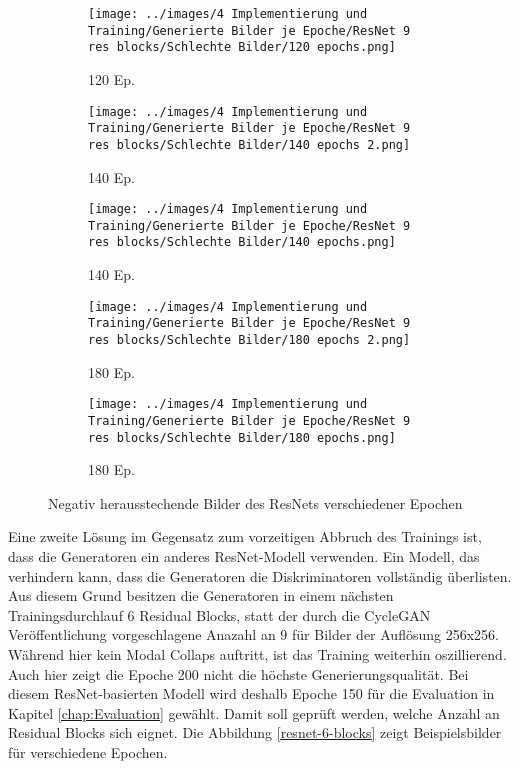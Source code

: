\begin{figure}[h]
    \centering
    \begin{subfigure}[b]{0.12\textwidth}
        \centering
        \texttt{[image: ../images/4 Implementierung und Training/Generierte Bilder je Epoche/ResNet 9 res blocks/Schlechte Bilder/120 epochs.png]}
        \caption{120 Ep.}
    \end{subfigure}
    \hspace{3em}%
    \begin{subfigure}[b]{0.12\textwidth}
        \centering
        \texttt{[image: ../images/4 Implementierung und Training/Generierte Bilder je Epoche/ResNet 9 res blocks/Schlechte Bilder/140 epochs 2.png]}
        \caption{140 Ep.}
    \end{subfigure}
    \hspace{3em}%
    \begin{subfigure}[b]{0.12\textwidth}
        \centering
        \texttt{[image: ../images/4 Implementierung und Training/Generierte Bilder je Epoche/ResNet 9 res blocks/Schlechte Bilder/140 epochs.png]}
        \caption{140 Ep.}
    \end{subfigure}
    \hspace{3em}%
    \begin{subfigure}[b]{0.12\textwidth}
        \centering
        \texttt{[image: ../images/4 Implementierung und Training/Generierte Bilder je Epoche/ResNet 9 res blocks/Schlechte Bilder/180 epochs 2.png]}
        \caption{180 Ep.}
    \end{subfigure}
    \hspace{3em}%
    \begin{subfigure}[b]{0.12\textwidth}
    \centering
    \texttt{[image: ../images/4 Implementierung und Training/Generierte Bilder je Epoche/ResNet 9 res blocks/Schlechte Bilder/180 epochs.png]}
    \caption{180 Ep.}
\end{subfigure}
        \caption{Negativ herausstechende Bilder des ResNets verschiedener Epochen}
        \label{fig:resnet-schlechte-bilder}
\end{figure}

Eine zweite Lösung im Gegensatz zum vorzeitigen Abbruch des Trainings ist, dass die Generatoren ein anderes ResNet-Modell verwenden. Ein Modell, das verhindern kann, dass die Generatoren die Diskriminatoren vollständig überlisten. Aus diesem Grund besitzen die Generatoren in einem nächsten Trainingsdurchlauf 6 Residual Blocks, statt der durch die \ac{CycleGAN} Veröffentlichung vorgeschlagene Anazahl an 9 für Bilder der Auflösung 256x256. Während hier kein Modal Collaps auftritt, ist das Training weiterhin oszillierend. Auch hier zeigt die Epoche 200 nicht die höchste Generierungsqualität. Bei diesem ResNet-basierten Modell wird deshalb Epoche 150 für die Evaluation in Kapitel \ref{chap:Evaluation} gewählt. Damit soll geprüft werden, welche Anzahl an Residual Blocks sich eignet. Die Abbildung \ref{resnet-6-blocks} zeigt Beispielsbilder für verschiedene Epochen.

